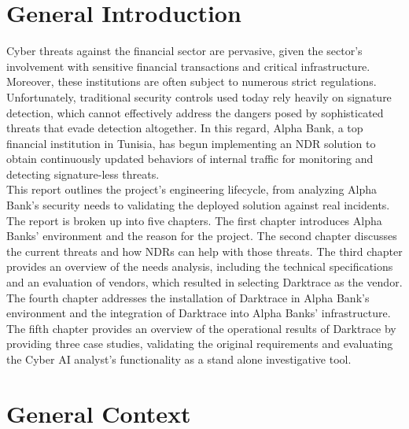 \documentclass[12pt,a4paper]{report}
\begin{document}
\chapter*{General Introduction}
Cyber threats against the financial sector are pervasive, given the sector's involvement with sensitive financial transactions and critical infrastructure. Moreover, these institutions are often subject to numerous strict regulations. Unfortunately, traditional security controls used today rely heavily on signature detection, which cannot effectively address the dangers posed by sophisticated threats that evade detection altogether. In this regard, Alpha Bank, a top financial institution in Tunisia, has begun implementing an NDR solution to obtain continuously updated behaviors of internal traffic for monitoring and detecting signature-less threats.\\

This report outlines the project's engineering lifecycle, from analyzing Alpha Bank's security needs to validating the deployed solution against real incidents.\\

The report is broken up into five chapters. The first chapter introduces Alpha Banks' environment and the reason for the project. The second chapter discusses the current threats and how NDRs can help with those threats. The third chapter provides an overview of the needs analysis, including the technical specifications and an evaluation of vendors, which resulted in selecting Darktrace as the vendor. The fourth chapter addresses the installation of Darktrace in Alpha Bank's environment and the integration of Darktrace into Alpha Banks' infrastructure. The fifth chapter provides an overview of the operational results of Darktrace by providing three case studies, validating the original requirements and evaluating the Cyber AI analyst's functionality as a stand alone investigative tool.

\clearpage
{}
\pagestyle{fancy}
\chapter{General Context}
\end{document}
